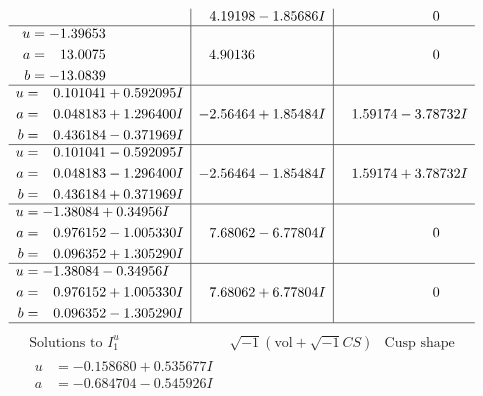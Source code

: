 \documentclass[1p]{elsarticle_modified}
\theoremstyle{definition}
\newcommand{\I}{\sqrt{-1}}
\begin{document}
$$\begin{array}{c|c|c}
 & \phantom{-}4.19198 - 1.85686 I & \phantom{-0.000000 } 0 \\ \hline\begin{aligned}
u &= -1.39653\phantom{ +0.000000I} \\
a &= \phantom{-}13.0075\phantom{ +0.000000I} \\
b &= -13.0839\phantom{ +0.000000I}\end{aligned}
 & \phantom{-}4.90136\phantom{ +0.000000I} & \phantom{-0.000000 } 0 \\ \hline\begin{aligned}
u &= \phantom{-}0.101041 + 0.592095 I \\
a &= \phantom{-}0.048183 + 1.296400 I \\
b &= \phantom{-}0.436184 - 0.371969 I\end{aligned}
 & -2.56464 + 1.85484 I & \phantom{-}1.59174 - 3.78732 I \\ \hline\begin{aligned}
u &= \phantom{-}0.101041 - 0.592095 I \\
a &= \phantom{-}0.048183 - 1.296400 I \\
b &= \phantom{-}0.436184 + 0.371969 I\end{aligned}
 & -2.56464 - 1.85484 I & \phantom{-}1.59174 + 3.78732 I \\ \hline\begin{aligned}
u &= -1.38084 + 0.34956 I \\
a &= \phantom{-}0.976152 - 1.005330 I \\
b &= \phantom{-}0.096352 + 1.305290 I\end{aligned}
 & \phantom{-}7.68062 - 6.77804 I & \phantom{-0.000000 } 0 \\ \hline\begin{aligned}
u &= -1.38084 - 0.34956 I \\
a &= \phantom{-}0.976152 + 1.005330 I \\
b &= \phantom{-}0.096352 - 1.305290 I\end{aligned}
 & \phantom{-}7.68062 + 6.77804 I & \phantom{-0.000000 } 0\\
 \hline 
 \end{array}$$\newpage$$\begin{array}{c|c|c}  
\text{Solutions to }I^u_{1}& \I (\text{vol} + \sqrt{-1}CS) & \text{Cusp shape}\\
 \hline 
\begin{aligned}
u &= -0.158680 + 0.535677 I \\
a &= -0.684704 - 0.545926 I \\

\end{aligned}
\end{array}$$
\end{document}
